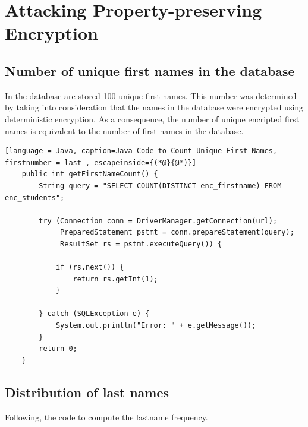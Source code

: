 \section{Attacking Property-preserving Encryption}

\subsection{Number of unique first names in the database}

In the database are stored 100 unique first names. This number was determined by taking into consideration that the names in the database were encrypted using deterministic encryption. As a consequence, the number of unique encripted first names is equivalent to the number of first names in the database.

\begin{lstlisting}[language = Java, caption=Java Code to Count Unique First Names, firstnumber = last , escapeinside={(*@}{@*)}]
    public int getFirstNameCount() {
        String query = "SELECT COUNT(DISTINCT enc_firstname) FROM enc_students";
    
        try (Connection conn = DriverManager.getConnection(url);
             PreparedStatement pstmt = conn.prepareStatement(query);
             ResultSet rs = pstmt.executeQuery()) {
    
            if (rs.next()) {
                return rs.getInt(1);
            }
    
        } catch (SQLException e) {
            System.out.println("Error: " + e.getMessage());
        }
        return 0;
    }
\end{lstlisting}

\subsection{Distribution of last names}

Following, the code to compute the lastname frequency.

